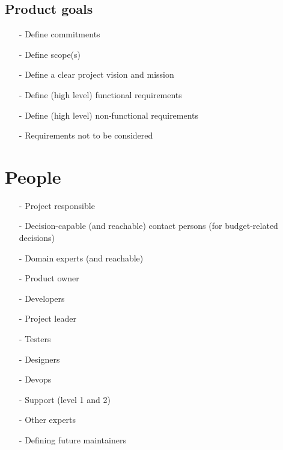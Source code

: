 \documentclass[
	fontsize=10pt, %
	twoside=false, %
	secnumdepth=1, %
]{kaobook}
\begin{document}
\section{Product goals}
	\begin{itemize}
		\item[-] Define commitments
		\item[-] Define scope(s)
		\item[-] Define a clear project vision and mission
		\item[-] Define (high level) functional requirements
		\item[-] Define (high level) non-functional requirements
		\item[-] Requirements not to be considered
	\end{itemize}

\chapter{People}
	\begin{itemize}
		\item[-] Project responsible
		\item[-] Decision-capable (and reachable) contact persons (for budget-related decisions)
		\item[-] Domain experts (and reachable)
		\item[-] Product owner
		\item[-] Developers
		\item[-] Project leader
		\item[-] Testers
		\item[-] Designers
		\item[-] Devops
		\item[-] Support (level 1 and 2)
		\item[-] Other experts
		\item[-] Defining future maintainers
	\end{itemize}
\end{document}
